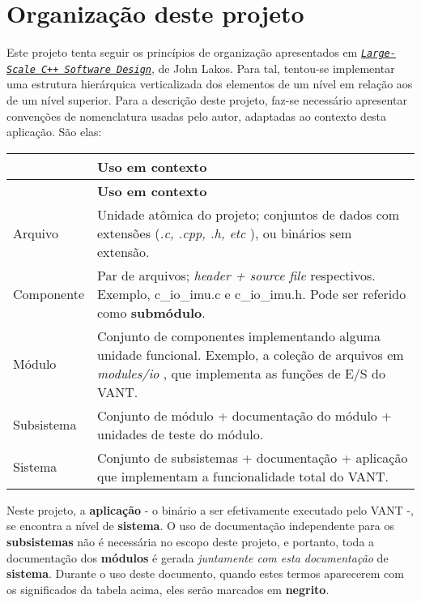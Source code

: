 \hypertarget{page_naming_page_naming_sec_codeorganization}{}\section{Organização deste projeto}\label{page_naming_page_naming_sec_codeorganization}
Este projeto tenta seguir os princípios de organização apresentados em {\itshape  \href{http://www.amazon.com/Large-Scale-Software-Design-John-Lakos/dp/0201633620}{\tt Large-\/\+Scale C++ Software Design}}, de John Lakos. Para tal, tentou-\/se implementar uma estrutura hierárquica verticalizada dos elementos de um nível em relação aos de um nível superior. Para a descrição deste projeto, faz-\/se necessário apresentar convenções de nomenclatura usadas pelo autor, adaptadas ao contexto desta aplicação. São elas\+:

\begin{center} \tabulinesep=1mm
\begin{longtabu} spread 0pt [c]{*2{|X[-1]}|}
\hline
{}&{\bf Uso em contexto  }\\
\endfirsthead
\hline
\endfoot
\hline
{}&{\bf Uso em contexto  }\\
\endhead
Arquivo &Unidade atômica do projeto; conjuntos de dados com extensões ({\itshape .c, .cpp, .h, etc }), ou binários sem extensão. \\
Componente &Par de arquivos; {\itshape  header + source file } respectivos. Exemplo, {\ttfamily c\+\_\+io\+\_\+imu.\+c} e {\ttfamily c\+\_\+io\+\_\+imu.\+h}. Pode ser referido como {\bfseries submódulo}. \\
Módulo &Conjunto de componentes implementando alguma unidade funcional. Exemplo, a coleção de arquivos em {\itshape  modules/io }, que implementa as funções de E/S do V\+A\+NT. \\
Subsistema &Conjunto de módulo + documentação do módulo + unidades de teste do módulo. \\
Sistema &Conjunto de subsistemas + documentação + aplicação que implementam a funcionalidade total do V\+A\+NT. \\
\end{longtabu}
\end{center} 

Neste projeto, a {\bfseries aplicação} -\/ o binário a ser efetivamente executado pelo V\+A\+NT -\/, se encontra a nível de {\bfseries sistema}. O uso de documentação independente para os {\bfseries subsistemas} não é necessária no escopo deste projeto, e portanto, toda a documentação dos {\bfseries módulos} é gerada {\itshape juntamente com esta documentação} de {\bfseries sistema}. Durante o uso deste documento, quando estes termos aparecerem com os significados da tabela acima, eles serão marcados em {\bfseries negrito}.

